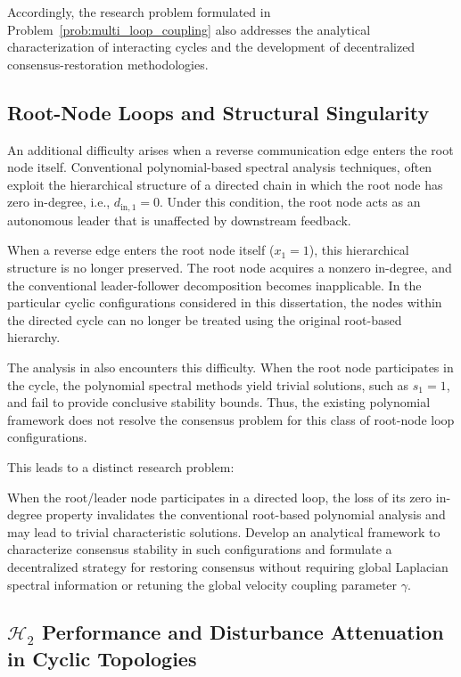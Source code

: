 Accordingly, the research problem formulated in Problem~\ref{prob:multi_loop_coupling} also addresses the analytical characterization of interacting cycles and the development of decentralized consensus-restoration methodologies.

\subsection{Root-Node Loops and Structural Singularity}
\label{subsec:root_node_loop}

An additional difficulty arises when a reverse communication edge enters the root node itself. Conventional polynomial-based spectral analysis techniques, often exploit the hierarchical structure of a directed chain in which the root node has zero in-degree, i.e., $d_{\mathrm{in},1}=0$. Under this condition, the root node acts as an autonomous leader that is unaffected by downstream feedback.

When a reverse edge enters the root node itself ($x_1=1$), this hierarchical structure is no longer preserved. The root node acquires a nonzero in-degree, and the conventional leader-follower decomposition becomes inapplicable. In the particular cyclic configurations considered in this dissertation, the nodes within the directed cycle can no longer be treated using the original root-based hierarchy.

The analysis in \cite{hao2019role} also encounters this difficulty. When the root node participates in the cycle, the polynomial spectral methods yield trivial solutions, such as $s_1=1$, and fail to provide conclusive stability bounds. Thus, the existing polynomial framework does not resolve the consensus problem for this class of root-node loop configurations.

This leads to a distinct research problem:
\begin{problem}
When the root/leader node participates in a directed loop, the loss of its zero in-degree property invalidates the conventional root-based polynomial analysis and may lead to trivial characteristic solutions. Develop an analytical framework to characterize consensus stability in such configurations and formulate a decentralized strategy for restoring consensus without requiring global Laplacian spectral information or retuning the global velocity coupling parameter $\gamma$.
\end{problem}

\subsection{$\mathcal{H}_2$ Performance and Disturbance Attenuation in Cyclic Topologies}
\label{subsec:h2_performance}

